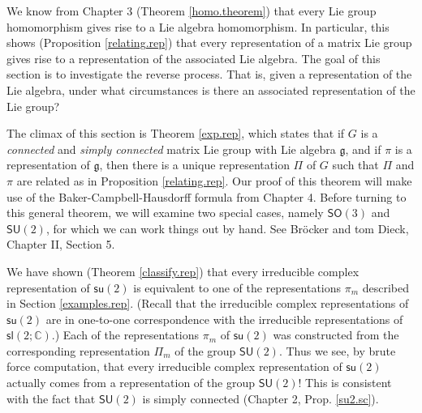 \documentclass[12pt]{amsbook}
\let \frak = \mathfrak
\theoremstyle{plain}
\numberwithin{equation}{chapter}
\numberwithin{theorem}{chapter}
\begin{document}
We know from Chapter 3 (Theorem \ref{homo.theorem}) that every Lie group
homomorphism gives rise to a Lie algebra homomorphism. In particular, this
shows (Proposition \ref{relating.rep}) that every representation of a matrix
Lie group gives rise to a representation of the associated Lie algebra. The
goal of this section is to investigate the reverse process. That is, given a
representation of the Lie algebra, under what circumstances is there an
associated representation of the Lie group?

The climax of this section is Theorem \ref{exp.rep}, which states that if $G$
is a \textit{connected} and \textit{simply connected} matrix Lie group with
Lie algebra $\frak{g}$, and if $\pi$ is a representation of $\frak{g}$, then
there is a unique representation $\Pi$ of $G$ such that $\Pi$ and $\pi$ are
related as in Proposition \ref{relating.rep}. Our proof of this theorem will
make use of the Baker-Campbell-Hausdorff formula from Chapter 4. Before
turning to this general theorem, we will examine two special cases, namely
$\mathsf{SO}(3)$ and $\mathsf{SU}(2)$, for which we can work things out by
hand. See Br\"{o}cker and tom Dieck, Chapter II, Section 5.

We have shown (Theorem \ref{classify.rep}) that every irreducible complex
representation of $\mathsf{su}(2)$ is equivalent to one of the representations
$\pi_{m}$ described in Section \ref{examples.rep}. (Recall that the
irreducible complex representations of $\mathsf{su}(2)$ are in one-to-one
correspondence with the irreducible representations of $\mathsf{sl}%
(2;\mathbb{C})$.) Each of the representations $\pi_{m}$ of $\mathsf{su}(2)$
was constructed from the corresponding representation $\Pi_{m}$ of the group
$\mathsf{SU}(2)$. Thus we see, by brute force computation, that every
irreducible complex representation of $\mathsf{su}(2)$ actually comes from a
representation of the group $\mathsf{SU}(2)$! This is consistent with the fact
that $\mathsf{SU}(2)$ is simply connected (Chapter 2, Prop. \ref{su2.sc}).
\end{document}
